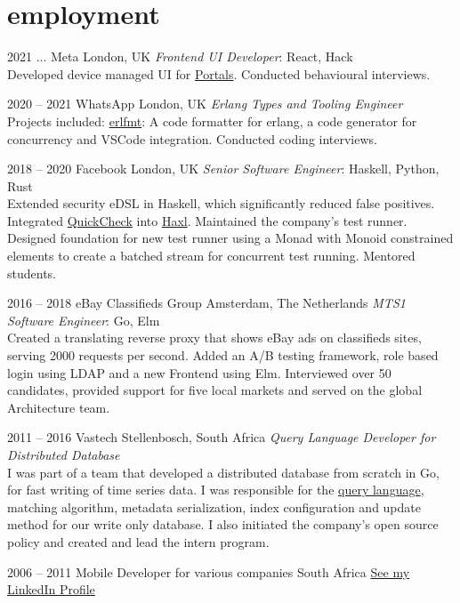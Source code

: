 \documentclass[print]{friggeri-cv-a4} %
\begin{document}
\section{employment}
\begin{entrylist}

\entry
{2021 ...}
{Meta}
{London, UK}
{\emph{Frontend UI Developer}: React, Hack \\
Developed device managed UI for \href{https://portal.facebook.com/business/}{Portals}. Conducted behavioural interviews.
}

\entry
{2020 -- 2021}
{WhatsApp}
{London, UK}
{\emph{Erlang Types and Tooling Engineer} \\
Projects included: \href{https://github.com/whatsapp/erlfmt}{erlfmt}: A code formatter for erlang, a code generator for concurrency and VSCode integration. Conducted coding interviews.
}

\entry
{2018 -- 2020}
{Facebook}
{London, UK}
{\emph{Senior Software Engineer}: Haskell, Python, Rust \\
Extended security eDSL in Haskell, which significantly reduced false positives. Integrated \href{https://hackage.haskell.org/package/QuickCheck}{QuickCheck} into \href{https://github.com/facebook/Haxl}{Haxl}.
Maintained the company's test runner. Designed foundation for new test runner using a Monad with Monoid constrained elements to create a batched stream for concurrent test running.  Mentored students.
}

\entry
{2016 -- 2018}
{eBay Classifieds Group}
{Amsterdam, The Netherlands}
{\emph{MTS1 Software Engineer}: Go, Elm \\
Created a translating reverse proxy that shows eBay ads on classifieds sites, serving 2000 requests per second. Added an A/B testing framework, role based login using LDAP and a new Frontend using Elm. Interviewed over 50 candidates, provided support for five local markets and served on the global Architecture team.
}

\entry
{2011 -- 2016}
{Vastech}
{Stellenbosch, South Africa}
{\emph{Query Language Developer for Distributed Database} \\
I was part of a team that developed a distributed database from scratch in Go, for fast writing of time series data. I was responsible for the \href{https://github.com/katydid/katydid}{query language}, matching algorithm, metadata serialization, index configuration and update method for our write only database. I also initiated the company's open source policy and created and lead the intern program.
}

\entry
{2006 -- 2011}
{Mobile Developer for various companies}
{South Africa}
{\href{https://za.linkedin.com/in/schulzewalter}{See my LinkedIn Profile}}

\end{entrylist}
\end{document}
